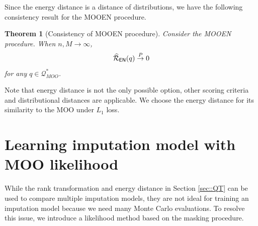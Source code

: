 \documentclass[aos, preprint]{imsart}
\theoremstyle{plain}
\newtheorem{theorem}{Theorem}[section]
\theoremstyle{definition}
\let\hat\widehat
\newcommand{\bX}{\mathbf{X}}
\newcommand{\bR}{\mathbf{R}}
\begin{document}


Since the energy distance is a distance of distributions, 
we have the following consistency result for the MOOEN procedure. 
\begin{theorem}[Consistency of MOOEN procedure]
\label{thm::MOOEN}
Consider the MOOEN procedure. 
When $n,M\rightarrow\infty$, 
$$
\hat{\mathcal{R}}_{\sf EN}(q)
\overset{P}{\rightarrow} 0
$$
for any $q \in \mathcal{Q}^*_{MOO}$.
\end{theorem}

Note that energy distance is not the only possible option, other scoring criteria \citep{gneiting2007strictly}
and distributional distances are applicable. 
We choose the energy distance for its similarity to the MOO under $L_1$ loss. 



\section{Learning imputation model with MOO likelihood}	\label{sec::learning}

While the rank transformation and energy distance in Section \ref{sec::QT} can be used to compare multiple imputation models,
they are not ideal for training an imputation model because
we need many Monte Carlo evaluations.
To resolve this issue, we introduce a likelihood method based on the masking procedure.
\end{document}
